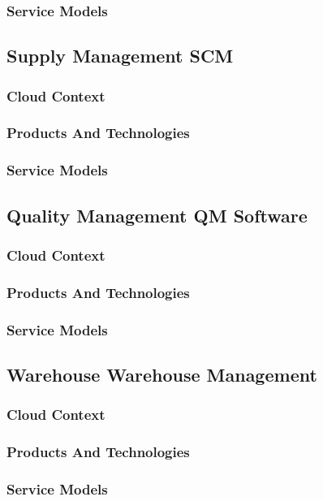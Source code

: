 \documentclass{llncs}
\begin{document}
\subsubsection{Service Models}

\subsection{Supply Management SCM}
\subsubsection{Cloud Context}
\subsubsection{Products And Technologies}
\subsubsection{Service Models}

\subsection{Quality Management QM Software}
\subsubsection{Cloud Context}
\subsubsection{Products And Technologies}
\subsubsection{Service Models}

\subsection{Warehouse Warehouse Management}
\subsubsection{Cloud Context}
\subsubsection{Products And Technologies}
\subsubsection{Service Models}
\end{document}
